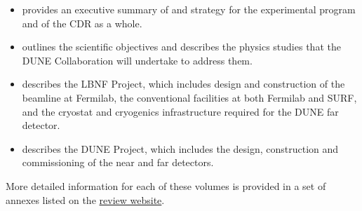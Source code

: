 \begin{itemize}
\item \volintro{} provides an executive summary of and strategy for the experimental 
program and of the CDR as a whole.
\item \volphys outlines the scientific objectives and describes the physics studies that 
the DUNE Collaboration will undertake to address them.
\item \vollbnf{} describes the LBNF Project, which includes design and construction of the 
beamline at Fermilab, the conventional facilities at both Fermilab and SURF, and the cryostat
 and cryogenics infrastructure required for the DUNE far detector.
\item \voldune{} describes the DUNE Project, which includes the design, construction and 
commissioning of the near and far detectors. 
\end{itemize}

More detailed information for each of these volumes is provided in a set of annexes listed on the \href{https://web.fnal.gov/project/LBNF/ReviewsAndAssessments/LBNF-DUNE%20CD-1-Refresh%20Directors%20Review/SitePages/Home.aspx}{review website}. 


